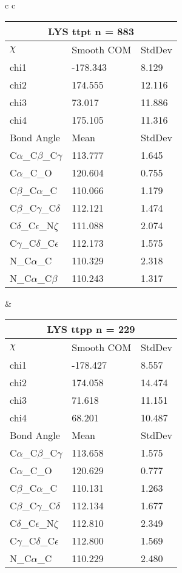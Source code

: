 \begin{longtable}{ c c }
  \begin{tabular}{ l l l }
  \toprule
  \multicolumn{3}{c}{LYS \textbf{ttpt} n = 883} \\ \toprule
  $\chi$       & Smooth COM & StdDev \\ \midrule
  chi1 & -178.343 & 8.129 \\ 
  chi2 & 174.555 & 12.116 \\ 
  chi3 & 73.017 & 11.886 \\ 
  chi4 & 175.105 & 11.316 \\ \midrule
  Bond Angle   & Mean     & StdDev \\ \midrule
  C$\alpha$\_C$\beta$\_C$\gamma$ & 113.777 & 1.645\\
  C$\alpha$\_C\_O & 120.604 & 0.755\\
  C$\beta$\_C$\alpha$\_C & 110.066 & 1.179\\
  C$\beta$\_C$\gamma$\_C$\delta$ & 112.121 & 1.474\\
  C$\delta$\_C$\epsilon$\_N$\zeta$ & 111.088 & 2.074\\
  C$\gamma$\_C$\delta$\_C$\epsilon$ & 112.173 & 1.575\\
  N\_C$\alpha$\_C & 110.329 & 2.318\\
  N\_C$\alpha$\_C$\beta$ & 110.243 & 1.317\\
  \bottomrule
  \end{tabular}
  &
  \begin{tabular}{ l l l }
  \toprule
  \multicolumn{3}{c}{LYS \textbf{ttpp} n = 229} \\ \toprule
  $\chi$       & Smooth COM & StdDev \\ \midrule
  chi1 & -178.427 & 8.557 \\ 
  chi2 & 174.058 & 14.474 \\ 
  chi3 & 71.618 & 11.151 \\ 
  chi4 & 68.201 & 10.487 \\ \midrule
  Bond Angle   & Mean     & StdDev \\ \midrule
  C$\alpha$\_C$\beta$\_C$\gamma$ & 113.658 & 1.575\\
  C$\alpha$\_C\_O & 120.629 & 0.777\\
  C$\beta$\_C$\alpha$\_C & 110.131 & 1.263\\
  C$\beta$\_C$\gamma$\_C$\delta$ & 112.134 & 1.677\\
  C$\delta$\_C$\epsilon$\_N$\zeta$ & 112.810 & 2.349\\
  C$\gamma$\_C$\delta$\_C$\epsilon$ & 112.800 & 1.569\\
  N\_C$\alpha$\_C & 110.229 & 2.480\\

\end{tabular}
\end{longtable}
